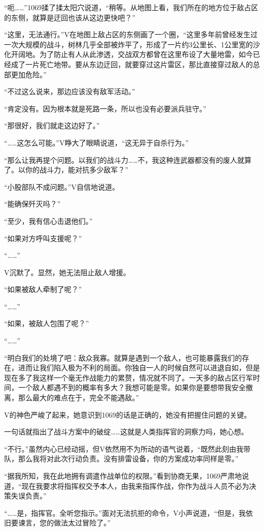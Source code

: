 “呃……”1069揉了揉太阳穴说道，“稍等。从地图上看，我们所在的地方位于敌占区的东侧，就算是迂回也该从这边更快吧？”

“这里，无法通行。”V在地图上敌占区的东侧画了一个圈，“这里多年前曾经发生过一次大规模的战斗，树林几乎全部被炸平了，形成了一片约3公里长、1公里宽的沙化开阔地。为了防止有人从此渗透，交战双方都曾在这里布设了大量地雷，如今已经成了一片死亡地带。要从东边迂回，就要穿过这片雷区，那比直接穿过敌人的总部更加危险。”

“不过这么说来，那边应该没有敌军活动。”

“肯定没有。因为根本就是死路一条，所以也没有必要派兵驻守。”

“那很好，我们就走这边好了。”

“……这怎么可能。”V睁大了眼睛说道，“这无异于自杀行为。”

“那么让我再提个问题。以我们的战斗力……不，我这种连武器都没有的废人就算了。以你的战斗力，能对抗多少敌军？”

“小股部队不成问题。”V自信地说道。

“能确保歼灭吗？”

“至少，我有信心击退他们。”

“如果对方呼叫支援呢？”

“……”

V沉默了。显然，她无法阻止敌人增援。

“如果被敌人牵制了呢？”

“……”

“如果，被敌人包围了呢？”

“……”

“明白我们的处境了吧：敌众我寡。就算是遇到一个敌人，也可能暴露我们的存在，进而让我们陷入极为不利的局面。你独自一人的时候自然可以进退自如，但是现在多了我这样一个毫无作战能力的累赘，情况就不同了。一天多的敌占区行军时间，一个敌人都遇不到的概率有多大？我想可能是零。如果你是要想带我安全撤离，那么最大的难点在于，完全不能遇敌。”

V的神色严峻了起来，她意识到1069的话是正确的，她没有把握住问题的关键。

一句话就指出了战斗方案中的破绽……这就是人类指挥官的洞察力吗，她心想。

“不行。”虽然内心已经动摇，但V依然用不为所动的语气说着，“既然此刻由我带队，那么我将对此次行动负责。没有排雷设备，你的方案成功率同样是零。”

“据我所知，我在此地拥有调遣作战单位的权限。”看到协商无果，1069严肃地说道，“现在我要求将指挥权交予本人，由我来指挥作战，你作为战斗人员不必为决策失误负责。”

“……是，指挥官。全听您指示。”面对无法抗拒的命令，V小声说道，“但是，我依旧要谏言，您的做法太过冒险了。”

